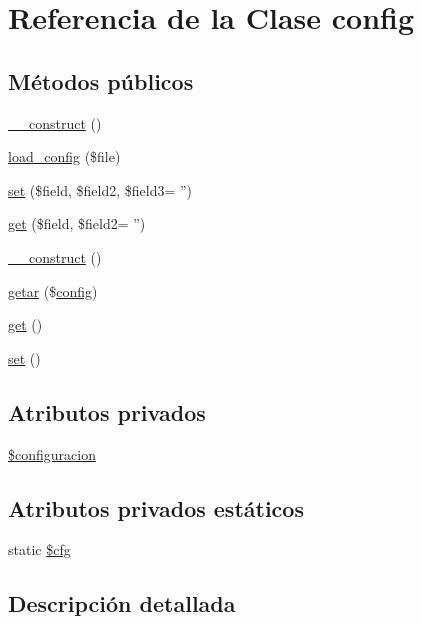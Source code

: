 \hypertarget{classconfig}{\section{Referencia de la Clase config}
\label{classconfig}
}
\subsection*{Métodos públicos}
\begin{DoxyCompactItemize}
\item 
\hyperlink{classconfig_a095c5d389db211932136b53f25f39685}{\-\_\-\-\_\-construct} ()
\item 
\hyperlink{classconfig_a8cbdce3df58f9387504463fc8bdce49b}{load\-\_\-config} (\$file)
\item 
\hyperlink{classconfig_ad79156f996f6a7dda9c351cd04cdd90e}{set} (\$field, \$field2, \$field3= '')
\item 
\hyperlink{classconfig_a00cfcd6dd3853ed5fa4b51c96dd84a94}{get} (\$field, \$field2= '')
\item 
\hyperlink{classconfig_a095c5d389db211932136b53f25f39685}{\-\_\-\-\_\-construct} ()
\item 
\hyperlink{classconfig_a6cac0b52ce92c9bc3b126ab97e678afe}{getar} (\$\hyperlink{classconfig}{config})
\item 
\hyperlink{classconfig_ac33ee765f5ad9f134540bac393721cfe}{get} ()
\item 
\hyperlink{classconfig_a89f017a6c12e98acec0d6833ea9c8994}{set} ()
\end{DoxyCompactItemize}
\subsection*{Atributos privados}
\begin{DoxyCompactItemize}
\item 
\hyperlink{classconfig_ace7f5eff49a2fcc4a52560aa72131428}{\$configuracion}
\end{DoxyCompactItemize}
\subsection*{Atributos privados estáticos}
\begin{DoxyCompactItemize}
\item 
static \hyperlink{classconfig_aefee7abaa50a3edbaa97b91500ad8d55}{\$cfg}
\end{DoxyCompactItemize}


\subsection{Descripción detallada}


